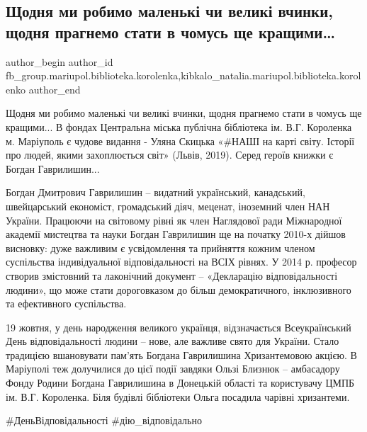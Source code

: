  
 
 
 
 

\subsection{Щодня ми робимо маленькі чи великі вчинки, щодня прагнемо стати в чомусь ще кращими…}
\label{sec:17_10_2021.fb.fb_group.mariupol.biblioteka.korolenka.1.shchodnya_mi_robimo_}
 
\ifcmt
 author_begin
   author_id fb_group.mariupol.biblioteka.korolenka,kibkalo_natalia.mariupol.biblioteka.korolenko
 author_end
\fi

Щодня ми робимо маленькі чи великі вчинки, щодня прагнемо стати в чомусь ще
кращими... В фондах Центральна міська публічна бібліотека ім. В.Г. Короленка м.
Маріуполь є чудове видання - Уляна Скицька «\#НАШІ на карті світу. Історії про
людей, якими захоплюється світ» (Львів, 2019). Серед героїв книжки є Богдан
Гаврилишин...

Богдан Дмитрович Гаврилишин – видатний український, канадський, швейцарський
економіст, громадський діяч, меценат, іноземний член НАН України. Працюючи на
світовому рівні як член Наглядової ради Міжнародної академії мистецтва та науки
Богдан Гаврилишин ще на початку 2010-х дійшов висновку: дуже важливим є
усвідомлення та прийняття кожним членом суспільства індивідуальної
відповідальності на ВСІХ рівнях. У 2014 р. професор створив змістовний та
лаконічний документ – «Декларацію відповідальності людини», що може стати
дороговказом до більш демократичного, інклюзивного та ефективного суспільства. 

19 жовтня, у день народження великого українця, відзначається Всеукраїнський
День відповідальності людини – нове, але важливе свято для України. Стало
традицією вшановувати пам'ять Богдана Гаврилишина Хризантемовою акцією. В
Маріуполі теж долучилися до цієї події завдяки Ользі Близнюк – амбасадору Фонду
Родини Богдана Гаврилишина в Донецькій області та користувачу ЦМПБ ім. В.Г.
Короленка. Біля будівлі бібліотеки Ольга посадила чарівні хризантеми. 

\#ДеньВідповідальності \#дію\_відповідально
